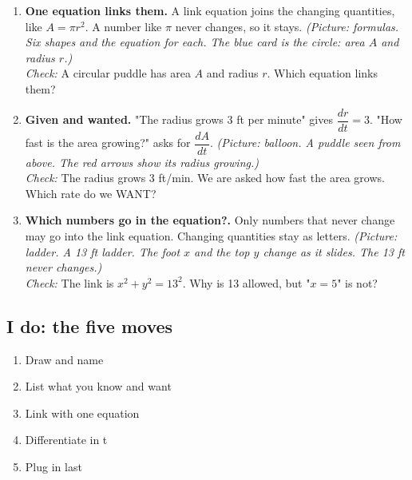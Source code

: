 \documentclass[11pt]{article}
\begin{document}
\begin{enumerate}
\item \textbf{One equation links them.} A link equation joins the changing quantities, like $A=\pi r^2$. A number like $\pi$ never changes, so it stays. \textit{(Picture: formulas. Six shapes and the equation for each. The blue card is the circle: area $A$ and radius $r$.)}\\ \textit{Check:} A circular puddle has area $A$ and radius $r$. Which equation links them? 
\item \textbf{Given and wanted.} "The radius grows 3 ft per minute" gives $\dfrac{dr}{dt}=3$. "How fast is the area growing?" asks for $\dfrac{dA}{dt}$. \textit{(Picture: balloon. A puddle seen from above. The red arrows show its radius growing.)}\\ \textit{Check:} The radius grows 3 ft/min. We are asked how fast the area grows. Which rate do we WANT? 
\item \textbf{Which numbers go in the equation?.} Only numbers that never change may go into the link equation. Changing quantities stay as letters. \textit{(Picture: ladder. A 13 ft ladder. The foot $x$ and the top $y$ change as it slides. The 13 ft never changes.)}\\ \textit{Check:} The link is $x^2+y^2=13^2$. Why is 13 allowed, but "$x=5$" is not? 
\end{enumerate}
\subsection*{I do: the five moves}\begin{enumerate}\item Draw and name
\item List what you know and want
\item Link with one equation
\item Differentiate in t
\item Plug in last\end{enumerate}
\end{document}
